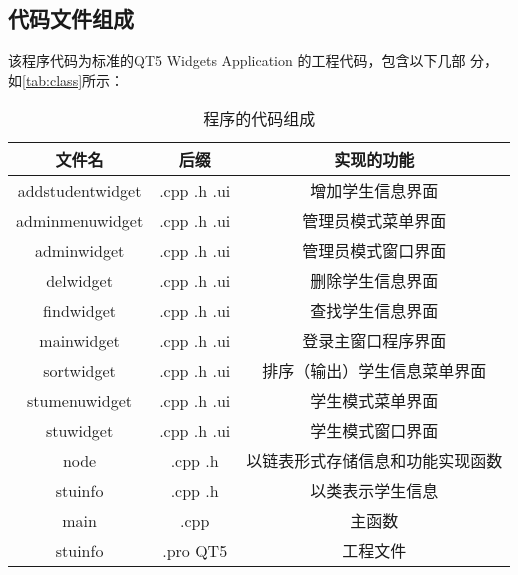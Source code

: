 \documentclass[
  ]{nwafuprojrep}
\begin{document}
\subsection{代码文件组成}
该程序代码为标准的QT5 Widgets Application 的工程代码，包含以下几部
分，如\autoref{tab:class}所示：
\begin{table}[!htb]
	\caption[程序的代码组成]{程序的代码组成\label{tab:class}}
	\begin{tabular}{ccc}
		\toprule
		文件名 & 后缀 & 实现的功能 \\
		\midrule
		addstudentwidget & .cpp .h .ui & 增加学生信息界面\\
		adminmenuwidget &.cpp .h .ui &管理员模式菜单界面\\
		adminwidget& .cpp .h .ui &管理员模式窗口界面\\
		delwidget& .cpp .h .ui &删除学生信息界面\\
		findwidget &.cpp .h .ui &查找学生信息界面\\
		mainwidget &.cpp .h .ui &登录主窗口程序界面\\
		sortwidget &.cpp .h .ui &排序（输出）学生信息菜单界面\\
		stumenuwidget &.cpp .h .ui &学生模式菜单界面\\
		stuwidget& .cpp .h .ui &学生模式窗口界面\\
		node &.cpp .h &以链表形式存储信息和功能实现函数\\
		stuinfo &.cpp .h &以类表示学生信息\\
		main& .cpp &主函数\\
		stuinfo &.pro QT5 &工程文件\\
		\bottomrule
	\end{tabular}
\end{table}
\end{document}
